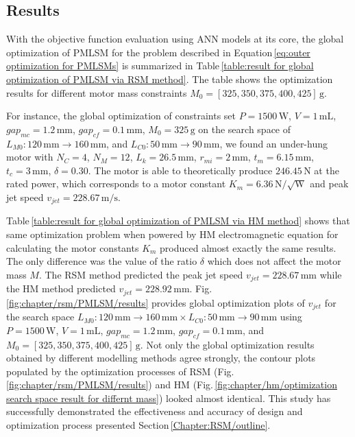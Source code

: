         \subsection{Results}                   \label{Chapter:RSM/PMLSM/Results}


            With the objective function evaluation using \acs{ANN} models at its core, the global optimization of \acs{PMLSM} for the problem described in Equation\,\ref{eq:outer optimization for PMLSMs} is summarized in Table\,\ref{table:result for global optimization of PMLSM via RSM method}. The table shows the optimization results for different motor mass constraints $M_0=[325,350,375,400,425]\,\mathrm{g}$.
            
            
            For instance, the global optimization of constraints set $P=1500\,\mathrm{W}$, $V=1\,\mathrm{mL}$, $gap_{mc}=1.2\,\mathrm{mm}$, $gap_{cf}=0.1\,\mathrm{mm}$, $M_0=325\,\mathrm{g}$ on the search space of $L_{M0}:120\,\mathrm{mm}\rightarrow 160\,\mathrm{mm}$, and $L_{C0}:50\,\mathrm{mm}\rightarrow 90\,\mathrm{mm}$, we found an under-hung motor with $N_C=4$, $N_M=12$, $L_k=26.5\,\mathrm{mm}$, $r_{mi}=2\,\mathrm{mm}$, $t_m=6.15\,\mathrm{mm}$, $t_c=3\,\mathrm{mm}$, $\delta=0.30$. The motor is able to theoretically produce $246.45\,\mathrm{N}$ at the rated power, which corresponds to a motor constant $K_m=6.36\,\mathrm{N/\sqrt{W}}$ and peak jet speed $v_{jet}=228.67\,\mathrm{m/s}$. 
            
            
            Table\,\ref{table:result for global optimization of PMLSM via HM method} shows that same optimization problem when powered by \acs{HM} electromagnetic equation for calculating the motor constants $K_m$ produced almost exactly the same results. The only difference was the value of the ratio $\delta$ which does not affect the motor mass $M$. The \acs{RSM} method predicted the peak jet speed $v_{jet}=228.67\,\mathrm{mm}$ while the \acs{HM} method predicted $v_{jet}=228.92\,\mathrm{mm}$. Fig.\,\ref{fig:chapter/rsm/PMLSM/results} provides global optimization plots of $v_{jet}$ for the search space $L_{M0}:120\,\mathrm{mm}\rightarrow 160\,\mathrm{mm} \times L_{C0}:50\,\mathrm{mm}\rightarrow 90\,\mathrm{mm}$ using $P=1500\,\mathrm{W}$, $V=1\,\mathrm{mL}$, $gap_{mc}=1.2\,\mathrm{mm}$, $gap_{cf}=0.1\,\mathrm{mm}$,  and $M_0=[325,350,375,400,425]\,\mathrm{g}$. Not only the global optimization results obtained by different modelling methods agree strongly, the contour plots populated by the optimization processes of \acs{RSM} (Fig.\,\ref{fig:chapter/rsm/PMLSM/results}) and \acs{HM} (Fig.\,\ref{fig:chapter/hm/optimization search space result for differnt mass}) looked almost identical. This study has successfully demonstrated the effectiveness and accuracy of design and optimization process presented Section\,\ref{Chapter:RSM/outline}.
        


